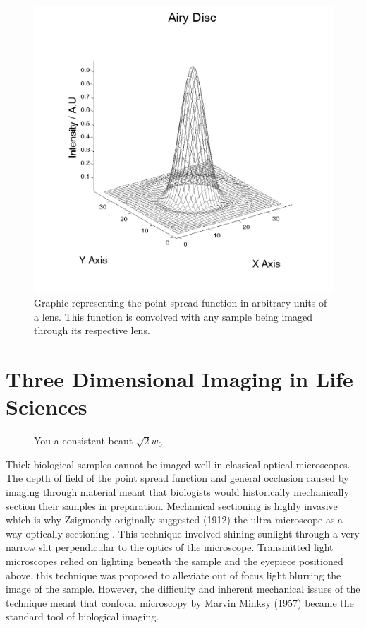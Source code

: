 \begin{figure}
	\centering
	\includegraphics[width=0.6\linewidth]{Airy_Disc}
	\caption[Airy Disc]{Graphic representing the point spread function in arbitrary units of a lens. This function is convolved with any sample being imaged through its respective lens.}
	\label{fig:Airy_Disc}
\end{figure}


%

\section{Three Dimensional Imaging in Life Sciences}


  \begin{figure}
  \centering
  \def\svgwidth{0.6\textwidth}
  
  \caption{You a consistent beaut $\sqrt2 w_0$}
  \end{figure}


Thick biological samples cannot be imaged well in classical optical microscopes. The depth of field of the point spread function and general occlusion caused by imaging through material meant that biologists would historically mechanically section their samples in preparation. Mechanical sectioning is highly invasive which is why Zsigmondy originally suggested (1912) the ultra-microscope as a way optically sectioning \cite{Mappes2012}. This technique involved shining sunlight through a very narrow slit perpendicular to the optics of the microscope. Transmitted light microscopes relied on lighting beneath the sample and the eyepiece positioned above, this technique was proposed to alleviate out of focus light blurring the image of the sample. However, the difficulty and inherent mechanical issues of the technique meant that confocal microscopy by Marvin Minksy (1957) \cite{Minsky1957} became the standard tool of biological imaging.

